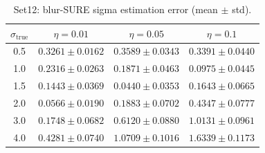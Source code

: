 \begin{table}[h]
\centering
\begin{tabular}{cccc}
\toprule
$\sigma_{\text{true}}$ & $\eta = 0.01$ & $\eta = 0.05$ & $\eta = 0.1$ \\
\midrule
0.5 & $0.3261 \pm 0.0162$ & $0.3589 \pm 0.0343$ & $0.3391 \pm 0.0440$ \\
1.0 & $0.2316 \pm 0.0263$ & $0.1871 \pm 0.0463$ & $0.0975 \pm 0.0445$ \\
1.5 & $0.1443 \pm 0.0369$ & $0.0440 \pm 0.0353$ & $0.1643 \pm 0.0665$ \\
2.0 & $0.0566 \pm 0.0190$ & $0.1883 \pm 0.0702$ & $0.4347 \pm 0.0777$ \\
3.0 & $0.1748 \pm 0.0682$ & $0.6120 \pm 0.0880$ & $1.0131 \pm 0.0961$ \\
4.0 & $0.4281 \pm 0.0740$ & $1.0709 \pm 0.1016$ & $1.6339 \pm 0.1173$ \\
\bottomrule
\end{tabular}
\caption{Set12: blur-SURE sigma estimation error (mean $\pm$ std).}
\label{tab:sigma_error_set12}
\end{table}
